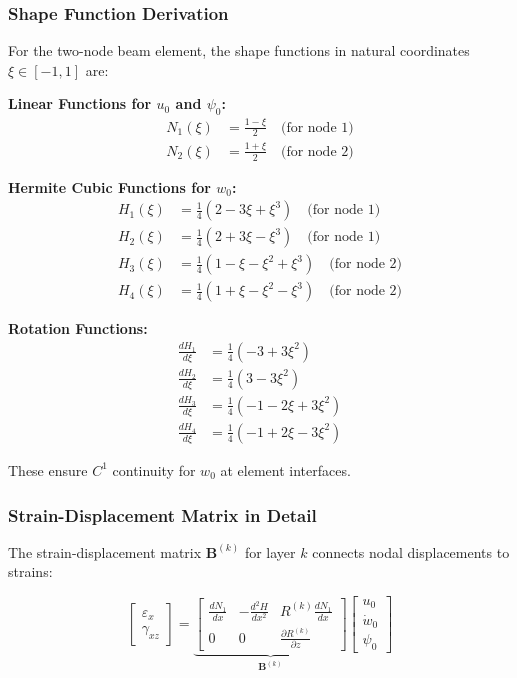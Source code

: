 \documentclass[12pt,a4paper]{article}
\begin{document}
\subsubsection{Shape Function Derivation}

For the two-node beam element, the shape functions in natural coordinates $\xi \in [-1,1]$ are:

\textbf{Linear Functions for $u_0$ and $\psi_0$:}
\begin{align}
N_1(\xi) &= \frac{1-\xi}{2} \quad \text{(for node 1)} \\
N_2(\xi) &= \frac{1+\xi}{2} \quad \text{(for node 2)}
\end{align}

\textbf{Hermite Cubic Functions for $w_0$:}
\begin{align}
H_1(\xi) &= \frac{1}{4}(2 - 3\xi + \xi^3) \quad \text{(for node 1)} \\
H_2(\xi) &= \frac{1}{4}(2 + 3\xi - \xi^3) \quad \text{(for node 1)} \\
H_3(\xi) &= \frac{1}{4}(1 - \xi - \xi^2 + \xi^3) \quad \text{(for node 2)} \\
H_4(\xi) &= \frac{1}{4}(1 + \xi - \xi^2 - \xi^3) \quad \text{(for node 2)}
\end{align}

\textbf{Rotation Functions:}
\begin{align}
\frac{dH_1}{d\xi} &= \frac{1}{4}(-3 + 3\xi^2) \\
\frac{dH_2}{d\xi} &= \frac{1}{4}(3 - 3\xi^2) \\
\frac{dH_3}{d\xi} &= \frac{1}{4}(-1 - 2\xi + 3\xi^2) \\
\frac{dH_4}{d\xi} &= \frac{1}{4}(-1 + 2\xi - 3\xi^2)
\end{align}

These ensure $C^1$ continuity for $w_0$ at element interfaces.

\subsubsection{Strain-Displacement Matrix in Detail}

The strain-displacement matrix $\mathbf{B}^{(k)}$ for layer $k$ connects nodal displacements to strains:

\begin{equation}
\begin{bmatrix}
\varepsilon_x \\ \gamma_{xz}
\end{bmatrix}
=
\underbrace{\begin{bmatrix}
\frac{dN_1}{dx} & -\frac{d^2H}{dx^2} & R^{(k)}\frac{dN_1}{dx} \\
0 & 0 & \frac{\partial R^{(k)}}{\partial z}
\end{bmatrix}}_{\mathbf{B}^{(k)}}
\begin{bmatrix}
u_0 \\ \dot{w}_0 \\ \psi_0
\end{bmatrix}
\end{equation}
\end{document}
